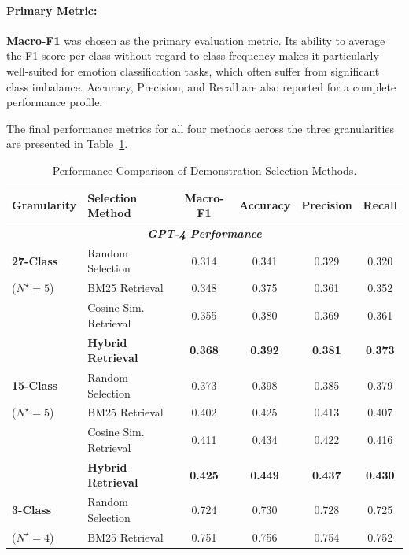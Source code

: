 \paragraph{Primary Metric:} \textbf{Macro-F1} was chosen as the primary evaluation metric. Its ability to average the F1-score per class without regard to class frequency makes it particularly well-suited for emotion classification tasks, which often suffer from significant class imbalance. Accuracy, Precision, and Recall are also reported for a complete performance profile.


The final performance metrics for all four methods across the three granularities are presented in Table~\ref{tab:unified-results}.

\begin{table}[H]
  \centering
  \caption{ Performance Comparison of Demonstration Selection Methods.}
  \label{tab:unified-results}
  \small
  \begin{tabular}{@{}llcccc@{}}
    \toprule
    \textbf{Granularity} & \textbf{Selection Method} & \textbf{Macro-F1} & \textbf{Accuracy} & \textbf{Precision} & \textbf{Recall} \\
    \midrule
    \multicolumn{6}{c}{\textit{\textbf{GPT-4 Performance}}} \\
    \midrule
    \textbf{27-Class} & Random Selection   & 0.314 & 0.341 & 0.329 & 0.320 \\
    ($N^\star=5$)     & BM25 Retrieval             & 0.348 & 0.375 & 0.361 & 0.352 \\
                      & Cosine Sim. Retrieval      & 0.355 & 0.380 & 0.369 & 0.361 \\
                      & \textbf{Hybrid Retrieval}  & \textbf{0.368} & \textbf{0.392} & \textbf{0.381} & \textbf{0.373} \\
    \midrule
    \textbf{15-Class} & Random Selection   & 0.373 & 0.398 & 0.385 & 0.379 \\
    ($N^\star=5$)     & BM25 Retrieval             & 0.402 & 0.425 & 0.413 & 0.407 \\
                      & Cosine Sim. Retrieval      & 0.411 & 0.434 & 0.422 & 0.416 \\
                      & \textbf{Hybrid Retrieval}  & \textbf{0.425} & \textbf{0.449} & \textbf{0.437} & \textbf{0.430} \\
    \midrule
    \textbf{3-Class}  & Random Selection   & 0.724 & 0.730 & 0.728 & 0.725 \\
    ($N^\star=4$)     & BM25 Retrieval             & 0.751 & 0.756 & 0.754 & 0.752 \\

\end{tabular}
\end{table}
